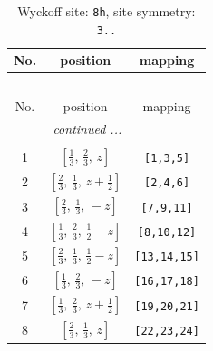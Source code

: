 \documentclass[fleqn,8pt]{jsarticle}
\begin{document}
\begin{longtable}{ccc}
\caption{Wyckoff site: {\tt 8h}, site symmetry: {\tt 3..}}
 \\
 \hline \hline
No. & position & mapping \\ \hline \endfirsthead

\multicolumn{2}{l}{\tablename\ \thetable{}} \\
 \hline \hline
No. & position & mapping \\ \hline \endhead

 \hline \hline
\multicolumn{2}{r}{\footnotesize\it continued ...} \\ \endfoot

 \hline \hline
\multicolumn{2}{r}{} \\ \endlastfoot

1 & $\left[ \frac{1}{3},\, \frac{2}{3},\, z \right]$ & {\tt [1,3,5]} \\ \hline
2 & $\left[ \frac{2}{3},\, \frac{1}{3},\, z + \frac{1}{2} \right]$ & {\tt [2,4,6]} \\ \hline
3 & $\left[ \frac{2}{3},\, \frac{1}{3},\, - z \right]$ & {\tt [7,9,11]} \\ \hline
4 & $\left[ \frac{1}{3},\, \frac{2}{3},\, \frac{1}{2} - z \right]$ & {\tt [8,10,12]} \\ \hline
5 & $\left[ \frac{2}{3},\, \frac{1}{3},\, \frac{1}{2} - z \right]$ & {\tt [13,14,15]} \\ \hline
6 & $\left[ \frac{1}{3},\, \frac{2}{3},\, - z \right]$ & {\tt [16,17,18]} \\ \hline
7 & $\left[ \frac{1}{3},\, \frac{2}{3},\, z + \frac{1}{2} \right]$ & {\tt [19,20,21]} \\ \hline
8 & $\left[ \frac{2}{3},\, \frac{1}{3},\, z \right]$ & {\tt [22,23,24]} \\
\end{longtable}
\renewcommand{\arraystretch}{1.2}
\end{document}
